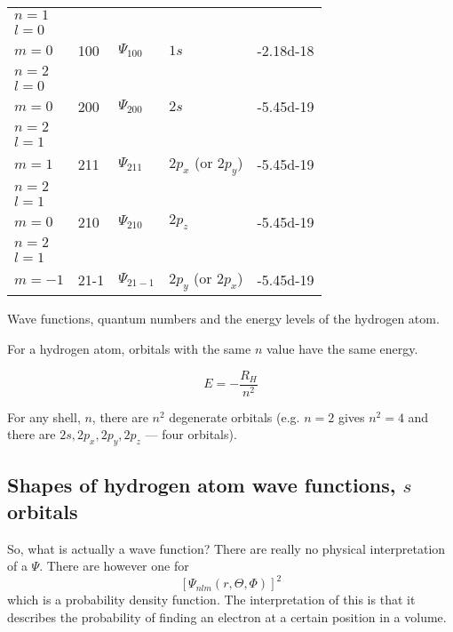\documentclass[../mit-general-chemistry.tex]{subfiles}
\begin{document}
\begin{htable}
  \begin{center}
    \begin{tabular}{lllll}
      \toprule
      $n = 1$ &&&\\
      $l = 0$ \\
      $m = 0$ & 100 & $\Psi_{100}$ & $1s$ & \num{-2.18d-18} \\
      \midrule
      $n = 2$ \\
      $l = 0$ \\
      $m = 0$ & 200 & $\Psi_{200}$ & $2s$ & \num{-5.45d-19} \\
      \midrule
      $n = 2$ \\
      $l = 1$ \\
      $m = 1$ & 211 & $\Psi_{211}$ & $2p_x$ (or $2p_y$) & \num{-5.45d-19} \\
      \midrule
      $n = 2$ \\
      $l = 1$ \\
      $m = 0$ & 210 & $\Psi_{210}$ & $2p_z$ & \num{-5.45d-19} \\
      \midrule
      $n = 2$ \\
      $l = 1$ \\
      $m = -1$ & 21-1 & $\Psi_{21-1}$ & $2p_y$ (or $2p_x$) & \num{-5.45d-19} \\
      \bottomrule
    \end{tabular}
  \end{center}
  \caption{ Wave functions, quantum numbers and the energy levels of
    the hydrogen atom.  }
\end{htable}

For a hydrogen atom, orbitals with the same $n$ value have the same
energy.

\begin{equation}
  E = - \frac{R_H}{n^2}
\end{equation}

For any shell, $n$, there are $n^2$ degenerate orbitals (e.g. $n = 2$
gives $n^2 = 4$ and there are $2s, 2p_x, 2p_y, 2p_z$ --- four
orbitals).








\subsection{Shapes of hydrogen atom wave functions, $s$ orbitals}

So, what is actually a wave function? There are really no physical
interpretation of a $\Psi$. There are however one for
\begin{equation}
  \left[ \Psi_{nlm}(r, \Theta, \Phi) \right]^2
\end{equation}
which is a probability density function. The interpretation of this is
that it describes the probability of finding an electron at a certain
position in a volume.
\end{document}
